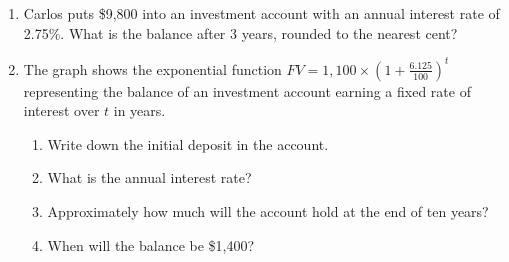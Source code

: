 \begin{enumerate}
\item Carlos puts \$9,800 into an investment account with an annual interest rate of 2.75\%. What is the balance after 3 years, rounded to the nearest cent? \vspace{2cm}

\item The graph shows the exponential function $\displaystyle FV=1,100 \times \left( 1+\frac{6.125}{100} \right)^t$ representing the balance of an investment account earning a fixed rate of interest over $t$ in years.
\begin{multicols}{2}
    \begin{enumerate}[itemsep=1cm]
        \item Write down the initial deposit in the account.
        \item What is the annual interest rate?
        \item Approximately how much will the account hold at the end of ten years?
        \item When will the balance be \$1,400?
    \end{enumerate}
    \begin{center}
    \end{center}
    \end{multicols}

\end{enumerate}




